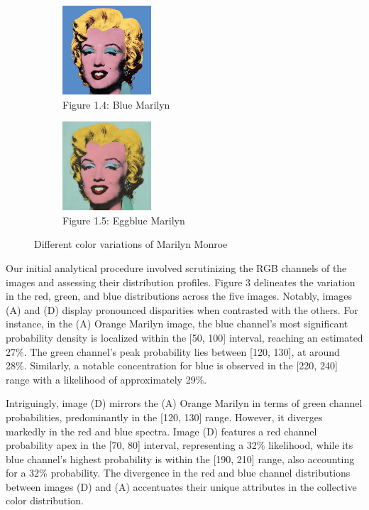 \documentclass{article}
\begin{document}
\begin{figure}[ht]
  \begin{minipage}{0.6\textwidth}
    \centering
    \begin{subfigure}{0.45\textwidth}
      \centering
      \includegraphics[width=125px]{main_files/figure-latex/1_4_blue_marilyn.jpg}
      \caption{Figure 1.4: Blue Marilyn}
      \label{fig:1_4_blue_marilyn}
    \end{subfigure}
    \hfill
    \begin{subfigure}{0.45\textwidth}
      \centering
      \includegraphics[width=125px]{main_files/figure-latex/1_5_eggblue_marilyn.jpg}
      \caption{Figure 1.5: Eggblue Marilyn}
      \label{fig:1_5_eggblue_marilyn}
    \end{subfigure}
  \end{minipage}

  \caption{Different color variations of Marilyn Monroe}
  \label{fig:marilyn_variations}
\end{figure}

Our initial analytical procedure involved scrutinizing the RGB channels
of the images and assessing their distribution profiles. Figure 3
delineates the variation in the red, green, and blue distributions
across the five images. Notably, images (A) and (D) display pronounced
disparities when contrasted with the others. For instance, in the (A)
Orange Marilyn image, the blue channel's most significant probability
density is localized within the {[}50, 100{]} interval, reaching an
estimated 27\%. The green channel's peak probability lies between
{[}120, 130{]}, at around 28\%. Similarly, a notable concentration for
blue is observed in the {[}220, 240{]} range with a likelihood of
approximately 29\%.

Intriguingly, image (D) mirrors the (A) Orange Marilyn in terms of green
channel probabilities, predominantly in the {[}120, 130{]} range.
However, it diverges markedly in the red and blue spectra. Image (D)
features a red channel probability apex in the {[}70, 80{]} interval,
representing a 32\% likelihood, while its blue channel's highest
probability is within the {[}190, 210{]} range, also accounting for a
32\% probability. The divergence in the red and blue channel
distributions between images (D) and (A) accentuates their unique
attributes in the collective color distribution.
\end{document}
